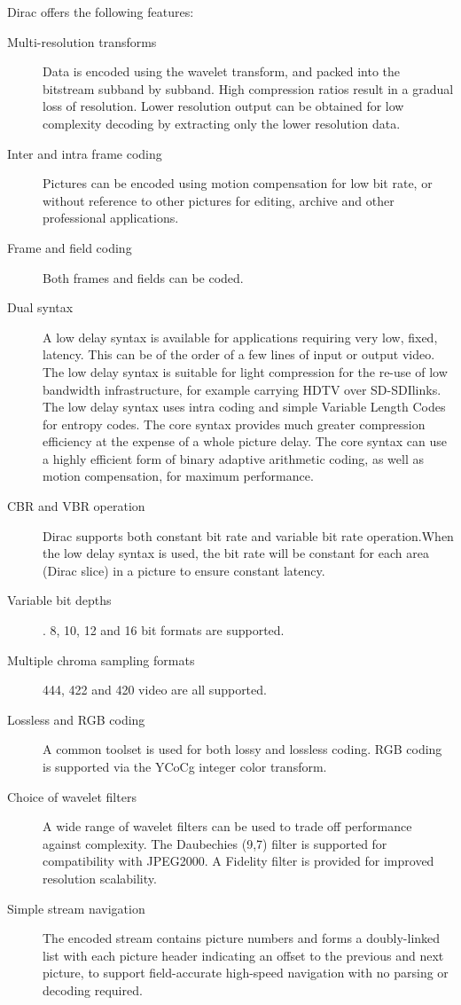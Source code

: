 Dirac offers the following features:
\begin{description}
\item[Multi-resolution transforms] Data is encoded using the wavelet transform, 
and packed into the bitstream subband by subband. High compression ratios result 
in a gradual loss of resolution. Lower resolution output can be obtained 
for low complexity decoding by extracting only the lower resolution data.
\item[Inter and intra frame coding] Pictures can be encoded using motion compensation
for low bit rate, or without reference to other pictures for editing, archive
and other professional applications.
\item[Frame and field coding] Both frames and fields can be coded.
\item[Dual syntax] A low delay syntax is available for applications requiring 
very low, fixed, latency. This can be of the order of a few lines of input 
or output video. The low delay syntax is suitable for light compression 
for the re-use of low bandwidth infrastructure, for example carrying 
HDTV over SD-SDIlinks. The low delay syntax uses intra coding and simple Variable Length 
Codes for entropy codes. The core syntax provides much greater compression efficiency 
at the expense of a whole picture delay. The core syntax can use a highly efficient 
form of binary adaptive arithmetic coding, as well as motion compensation, 
for maximum performance.
\item[CBR and VBR operation] Dirac supports both constant bit rate and 
variable bit rate operation.When the low delay syntax is used, the bit 
rate will be constant for each area (Dirac slice) in a picture to ensure constant latency.
\item[Variable bit depths]. 8, 10, 12 and 16 bit formats are supported.
\item[Multiple chroma sampling formats] 444, 422 and 420 video are all supported.
\item[Lossless and RGB coding] A common toolset is used for both lossy and lossless 
coding. RGB coding is supported via the YCoCg integer color transform.
\item[Choice of wavelet filters] A wide range of wavelet filters can be used 
to trade off performance against complexity. The Daubechies (9,7) filter is 
supported for compatibility with JPEG2000. A Fidelity filter is provided for 
improved resolution scalability.
\item[Simple stream navigation] The encoded stream contains picture numbers and 
forms a doubly-linked list with each picture header indicating an offset to 
the previous and next picture, to support field-accurate high-speed navigation
with no parsing or decoding required.
\end{description}
